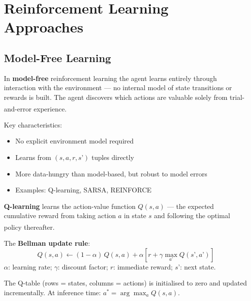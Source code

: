     \section{Reinforcement Learning Approaches}

    \subsection{Model-Free Learning}
    \begin{tcbitemize}[ skin=sectionraster ]

    \tcbitem[title=Model-Free RL, raster multicolumn=3]
    In \textbf{model-free} reinforcement learning the agent learns entirely through
    interaction with the environment --- no internal model of state transitions or
    rewards is built. The agent discovers which actions are valuable solely from
    trial-and-error experience.\textsuperscript{\cite[][p.~348]{hurbansGrokkingArtificialIntelligence2020}}

    Key characteristics:
    \begin{itemize}
        \item No explicit environment model required
        \item Learns from $(s, a, r, s’)$ tuples directly
        \item More data-hungry than model-based, but robust to model errors
        \item Examples: Q-learning, SARSA, REINFORCE
    \end{itemize}

    \tcbitem[title=The Q-Learning Update, raster multicolumn=3]
    \textbf{Q-learning} learns the action-value function $Q(s,a)$ --- the expected
    cumulative reward from taking action $a$ in state $s$ and following the
    optimal policy thereafter.\textsuperscript{\cite[][pp.~335--340]{hurbansGrokkingArtificialIntelligence2020}}

    The \textbf{Bellman update rule}:
    \begin{equation}
        Q(s,a) \leftarrow (1{-}\alpha)\,Q(s,a)
                 + \alpha\!\left[r + \gamma \max_{a’} Q(s’,a’)\right]
    \end{equation}
    $\alpha$: learning rate; $\gamma$: discount factor; $r$: immediate reward;
    $s’$: next state.

    The Q-table (rows = states, columns = actions) is initialised to zero and
    updated incrementally. At inference time: $a^* = \arg\max_a Q(s,a)$.


\end{tcbitemize}
